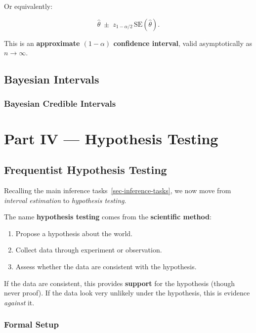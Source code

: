 \documentclass[
  letterpaper,
  DIV=11,
  numbers=noendperiod]{scrreprt}
\providecommand{\tightlist}{%
  \setlength{\itemsep}{0pt}\setlength{\parskip}{0pt}}
\theoremstyle{definition}
\theoremstyle{plain}
\theoremstyle{definition}
\theoremstyle{remark}
\begin{document}
Or equivalently:

\[
\hat{\theta} \;\pm\; z_{1-\alpha/2}\,\text{SE}(\hat{\theta}).
\]

This is an \textbf{approximate \((1-\alpha)\) confidence interval},
valid asymptotically as \(n \to \infty\).

\chapter{Bayesian Intervals}\label{sec-bayesian-intervals}

\section{Bayesian Credible Intervals}\label{bayesian-credible-intervals}

\part{Part IV --- Hypothesis Testing}

\chapter{Frequentist Hypothesis
Testing}\label{frequentist-hypothesis-testing}

Recalling the {main inference tasks~\ref{sec-inference-tasks}}, we now
move from \emph{interval estimation} to \emph{hypothesis testing}.

The name \textbf{hypothesis testing} comes from the \textbf{scientific
method}:

\begin{enumerate}
\def\labelenumi{\arabic{enumi}.}
\tightlist
\item
  Propose a hypothesis about the world.
\item
  Collect data through experiment or observation.
\item
  Assess whether the data are consistent with the hypothesis.
\end{enumerate}

If the data are consistent, this provides \textbf{support} for the
hypothesis (though never proof). If the data look very unlikely under
the hypothesis, this is evidence \emph{against} it.

\section{Formal Setup}\label{formal-setup}
\end{document}
